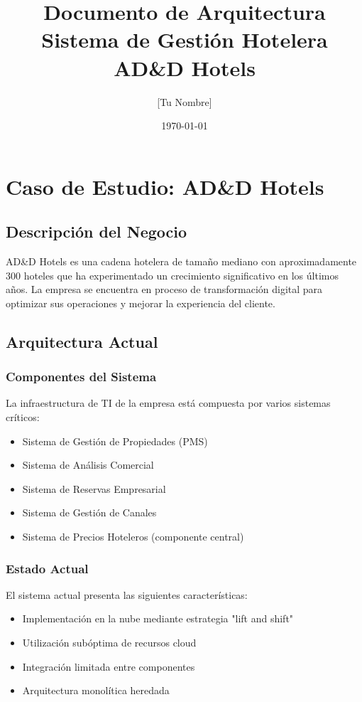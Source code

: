 \documentclass[12pt,a4paper]{article}
\title{Documento de Arquitectura\\
       Sistema de Gestión Hotelera AD\&D Hotels}
\author{[Tu Nombre]}
\date{\today}
\begin{document}
\maketitle

\tableofcontents
\newpage

\chapter{Caso de Estudio: AD\&D Hotels}

\section{Descripción del Negocio}
AD\&D Hotels es una cadena hotelera de tamaño mediano con aproximadamente 300 hoteles que ha experimentado un crecimiento significativo en los últimos años. La empresa se encuentra en proceso de transformación digital para optimizar sus operaciones y mejorar la experiencia del cliente.

\section{Arquitectura Actual}
\subsection{Componentes del Sistema}
La infraestructura de TI de la empresa está compuesta por varios sistemas críticos:
\begin{itemize}
    \item Sistema de Gestión de Propiedades (PMS)
    \item Sistema de Análisis Comercial
    \item Sistema de Reservas Empresarial
    \item Sistema de Gestión de Canales
    \item Sistema de Precios Hoteleros (componente central)
\end{itemize}

\subsection{Estado Actual}
El sistema actual presenta las siguientes características:
\begin{itemize}
    \item Implementación en la nube mediante estrategia "lift and shift"
    \item Utilización subóptima de recursos cloud
    \item Integración limitada entre componentes
    \item Arquitectura monolítica heredada
\end{itemize}
\end{document}
